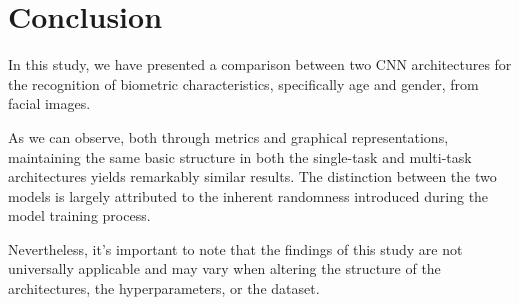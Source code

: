 \section{Conclusion} \label{sec:conclusions}
In this study, we have presented a comparison between two CNN
architectures for the recognition of biometric characteristics,
specifically age and gender, from facial images.

As we can observe, both through metrics and graphical representations,
maintaining the same basic structure in both the single-task and multi-task
architectures yields remarkably similar results.
The distinction between the two models is largely attributed to the
inherent randomness introduced during the model training process.

Nevertheless, it's important to note that the findings of this study
are not universally applicable and may vary when altering the
structure of the architectures, the hyperparameters, or the dataset.